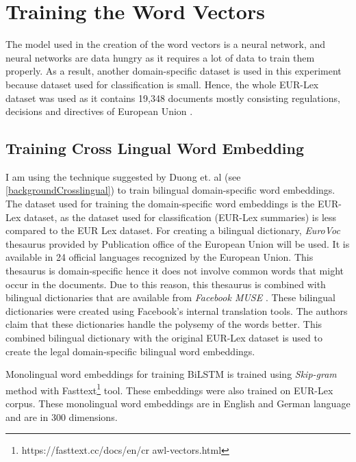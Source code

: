 \section{Training the Word Vectors}

The model used in the creation of the word vectors is a neural network, and neural networks are data hungry as it requires a lot of data to train them properly. As a result, another domain-specific dataset is used in this experiment because dataset used for classification is small. Hence, the whole EUR-Lex dataset was used as it contains 19,348 documents mostly consisting regulations, decisions and directives of European Union \cite{jf:SemanticLaw}.

\subsection{Training Cross Lingual Word Embedding}\label{implementationCrossLingual}

I am using the technique suggested by Duong et. al \cite{duong-EtAl:2016:EMNLP} (see \ref{backgroundCrosslingual}) to train bilingual domain-specific word embeddings.
The dataset used for training the domain-specific word embeddings is the EUR-Lex dataset, as the dataset used for classification (EUR-Lex summaries) is less compared to the EUR Lex dataset. For creating a bilingual dictionary, \textit{EuroVoc} thesaurus \cite{steinberger2002cross} provided by Publication office of the European Union will be used. It is available in 24 official languages recognized by the European Union. This thesaurus is domain-specific hence it does not involve common words that might occur in the documents. Due to this reason, this thesaurus is combined with bilingual dictionaries that are available from \textit{Facebook MUSE} \cite{conneau2017word}. These bilingual dictionaries were created using Facebook's internal translation tools. The authors claim that these dictionaries handle the polysemy of the words better. This combined bilingual dictionary with the original EUR-Lex dataset is used to create the legal domain-specific bilingual word embeddings. 

Monolingual word embeddings for training \gls{BiLSTM} is trained using \textit{Skip-gram} method with Fasttext\footnote{https://fasttext.cc/docs/en/cr awl-vectors.html}\cite{graves2009novel} tool. These embeddings were also trained on EUR-Lex corpus. These monolingual word embeddings are in English and German language and are in 300 dimensions.

